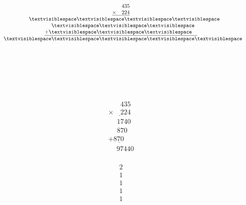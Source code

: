 \begin{minipage}[t]{0.3\linewidth}
\begin{align*}\begin{array}{c}
\phantom{
\times00
}
435\\
\underline{
\times
\phantom{
00
}
224
}\\
\phantom{
+0
}
\textvisiblespace
\textvisiblespace
\textvisiblespace
\textvisiblespace
\\
\phantom{
+0
}
\textvisiblespace
\textvisiblespace
\textvisiblespace
\phantom0\\
\underline{
+
\textvisiblespace
\textvisiblespace
\textvisiblespace
\phantom0\phantom0
}
\\
\phantom{+}
\textvisiblespace
\textvisiblespace
\textvisiblespace
\textvisiblespace
\textvisiblespace
\end{array}\end{align*}
\end{minipage}
\begin{minipage}[t]{0.05\linewidth}
\begin{align*}\begin{array}{c}
\textvisiblespace
\\
\textvisiblespace
\\
\textvisiblespace
\\
\textvisiblespace
\\
\textvisiblespace
\end{array}\end{align*}
\end{minipage}
\begin{minipage}[t]{0.3\linewidth}
\begin{align*}\begin{array}{c}
\phantom{
\times00
}
435\\
\underline{
\times
\phantom{
00
}
224
}\\
\phantom{
+0
}
1740
\\
\phantom{
+0
}
870
\phantom0\\
\underline{
+
870
\phantom0\phantom0
}
\\
\phantom{+}
97440
\end{array}\end{align*}
\end{minipage}
\begin{minipage}[t]{0.05\linewidth}
\begin{align*}\begin{array}{c}
2
\\
1
\\
1
\\
1
\\
1
\end{array}\end{align*}
\end{minipage}

